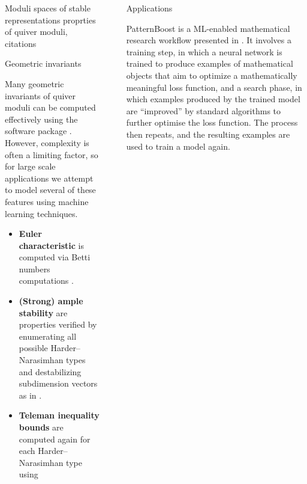 \documentclass[final]{beamer}
\newcommand{\todo}[1]{{\color{blue}#1}}
\newlength{\sepwidth}
\newlength{\colwidth}
\newcommand{\separatorcolumn}{\begin{column}{\sepwidth}\end{column}}
\begin{document}
\begin{frame}[t]
\begin{columns}[t]
\begin{column}{\colwidth}
\begin{block}{Moduli spaces of stable representations}
    \todo{proprties of quiver moduli, citations}

  \end{block}

  \begin{alertblock}{Geometric invariants}

    Many geometric invariants of quiver moduli can be computed effectively
    using the software package \quivertools \cite{quivertools}.
    However, complexity is often a limiting factor,
    so for large scale applications we attempt to model
    several of these features using machine learning techniques.

    \begin{itemize}
      \item \textbf{Euler characteristic} is computed via Betti numbers computations \cite{}.

      \item \textbf{(Strong) ample stability} are properties verified by enumerating
      all possible Harder--Narasimhan types and destabilizing subdimension vectors as in \cite{2311.17003}.

      \item \textbf{Teleman inequality bounds} are computed again
      for each Harder--Narasimhan type using \cite{}
    \end{itemize}

  \end{alertblock}

\end{column}

\separatorcolumn

\begin{column}{\colwidth}

  \begin{block}{Applications}

    PatternBoost is a ML-enabled mathematical research workflow presented in \cite{}.
    It involves a training step,
    in which a neural network is trained to produce examples of mathematical objects
    that aim to optimize a mathematically meaningful loss function, and a search phase,
    in which examples produced by the trained model are ``improved'' by standard algorithms
    to further optimise the loss function.
    The process then repeats, and the resulting examples are used to train a model again.


\end{block}
\end{column}
\end{columns}
\end{frame}
\end{document}
